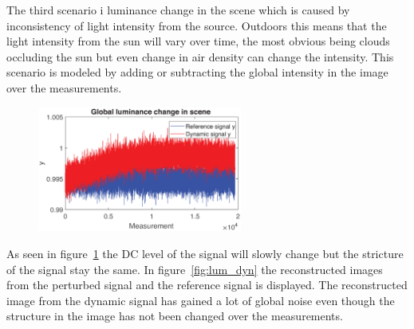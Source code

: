 



The third scenario i luminance change in the scene which is caused by inconsistency of light intensity from the source. Outdoors this means that the light intensity from the sun will vary over time, the most obvious being clouds occluding the sun but even change in air density can change the intensity. This scenario is modeled by adding or subtracting the global intensity in the image over the measurements. 

\begin{figure}[H]
    \includegraphics[width=0.6\textwidth]{result/dynamic/lum/intense_change1.eps}
    \label{fig:lum_sig_1}
\end{figure}

As seen in figure~\ref{fig:lum_sig_1} the DC level of the signal will slowly change but the stricture of the signal stay the same. In figure~\ref{fig:lum_dyn} the reconstructed images from the perturbed signal and the reference signal is displayed. The reconstructed image from the dynamic signal has gained a lot of global noise even though the structure in the image has not been changed over the measurements.  


